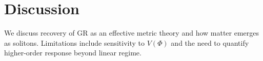 
\section{Discussion}
We discuss recovery of GR as an effective metric theory and how matter emerges as solitons. Limitations include sensitivity to $V(\Phi)$ and the need to quantify higher-order response beyond linear regime.
